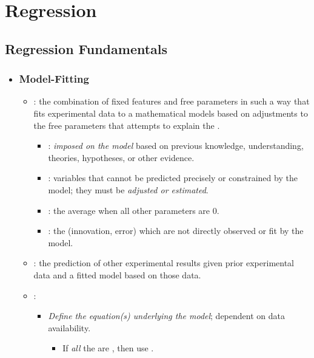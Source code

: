 \chapter{Regression}

\section{Regression Fundamentals}
\begin{itemize}
  \item[]
  
  \subsection{Model-Fitting}
  \begin{itemize}
    \item {}: the combination of fixed features and free parameters in such a way that fits experimental data to a mathematical models based on adjustments to the free parameters that attempts to explain the .
      \begin{itemize}
        \item {}:  \emph{imposed on the model} based on previous knowledge, understanding, theories, hypotheses, or other evidence. 
        \item {}: variables that cannot be predicted precisely or constrained by the model; they must be \emph{adjusted or estimated}.
        \item {}: the average when all other parameters are 0.
        \item {}: the  (innovation, error)  which are not directly observed or fit by the model.
      \end{itemize}
    \item {}: the prediction of other experimental results given prior experimental data and a fitted model based on those data.
    \item {}:
    \begin{itemize}
      \item \emph{Define the equation(s) underlying the model}; dependent on data availability. %
        \begin{itemize}
          \item If \emph{all} the  are \hyperref[Subsection: Data Types]{}, then use \hyperref[Chapter: Analysis of Variance]{}.

\end{itemize}
\end{itemize}
\end{itemize}
\end{itemize}

